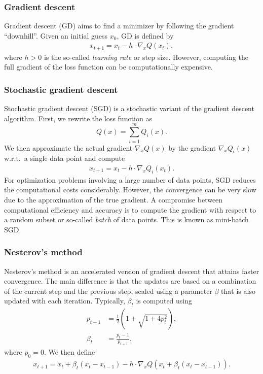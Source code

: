 \documentclass
[
    a4paper,
    DIV=11,
    abstract=true,
    11pt,
]
{scrartcl}
\theoremstyle{definition}
\begin{document}
\subsubsection{Gradient descent}

Gradient descent (GD) aims to find a minimizer by following the gradient ``downhill''. Given an initial guess $ x_0 $, GD is defined by
\begin{align*}
    x_{t+1} = x_t - h \cdot \nabla_x Q(x_t),
\end{align*}
where $h>0$ is the so-called \emph{learning rate} or step size. However, computing the full gradient of the loss function can be computationally expensive.

\subsubsection{Stochastic gradient descent}

Stochastic gradient descent (SGD) is a stochastic variant of the gradient descent algorithm. First, we rewrite the loss function as
\begin{equation*}
     Q(x) = \sum_{i=1}^m Q_i(x).
\end{equation*}
We then approximate the actual gradient $\nabla_x Q(x)$ by the gradient $\nabla_x Q_i(x)$ w.r.t.\ a single data point and compute
\begin{align*}
    x_{t+1} = x_t - h \cdot \nabla_x Q_i(x_t).
\end{align*}
For optimization problems involving a large number of data points, SGD reduces the computational costs considerably. However, the convergence can be very slow due to the approximation of the true gradient. A compromise between computational efficiency and accuracy is to compute the gradient with respect to a random subset or so-called \emph{batch} of data points. This is known as mini-batch SGD.

\subsubsection{Nesterov's method}

Nesterov's method \cite{nesterov2018lectures,nesterov1983} is an accelerated version of gradient descent that attains faster convergence. The main difference is that the updates are based on a combination of the current step and the previous step, scaled using a parameter $\beta$ that is also updated with each iteration. Typically, $\beta_t$ is computed using
\begin{align*}
    p_{t+1} &= \frac{1}{2}\left(1 + \sqrt{1 + 4p_t^2}\right), \\
    \beta_t &= \frac{p_t - 1}{p_{t+1}},
\end{align*}
where $ p_0 = 0 $. We then define
\begin{align*}
    x_{t+1} = x_t + \beta_t(x_t - x_{t-1}) - h \cdot \nabla_x Q(x_t + \beta_t(x_t - x_{t-1})).
\end{align*}
\end{document}
